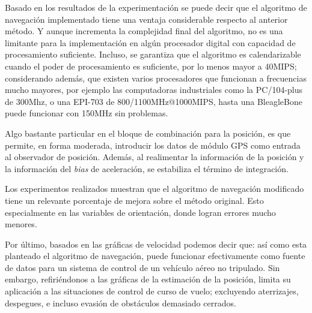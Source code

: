 \documentclass[10pt]{report}
\numberwithin{equation}{chapter}
\numberwithin{algorithm}{chapter}
\newcommand{\bias}{\emph{bias} }
\begin{document}
\par
Basado en los resultados de la experimentación se puede decir que el algoritmo de navegación implementado tiene una ventaja considerable respecto al anterior método. Y aunque incrementa la complejidad final del algoritmo, no es una limitante para la implementación en algún procesador digital con capacidad de procesamiento suficiente. Incluso, se garantiza que el algoritmo es calendarizable cuando el poder de procesamiento es suficiente, por lo menos mayor a 40MIPS; considerando además, que existen varios procesadores que funcionan a frecuencias mucho mayores, por ejemplo las computadoras industriales como la PC/104-plus de 300Mhz, o una EPI-703 de 800/1100MHz@1000MIPS, hasta una BleagleBone puede funcionar con 150MHz sin problemas.\par
Algo bastante particular en el bloque de combinación para la posición, es que permite, en forma moderada, introducir los datos de módulo GPS como entrada al observador de posición. Además, al realimentar la información de la posición y la información del \bias de aceleración, se estabiliza el término de integración.\par
Los experimentos realizados muestran que el algoritmo de navegación modificado tiene un relevante porcentaje de mejora sobre el método original. Esto especialmente en las variables de orientación, donde logran errores mucho menores.\par
Por último, basados en las gráficas de velocidad podemos decir que: así como esta planteado el algoritmo de navegación, puede funcionar efectivamente como fuente de datos para un sistema de control de un vehículo aéreo no tripulado. Sin embargo, refiriéndonos a las gráficas de la estimación de la posición, limita su aplicación a las situaciones de control de curso de vuelo; excluyendo aterrizajes, despegues, e incluso evasión de obstáculos demasiado cerrados.\par
\end{document}
